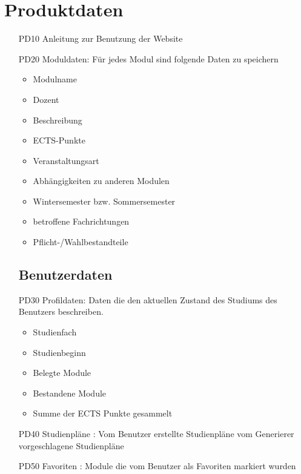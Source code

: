 \section{Produktdaten}
	\begin{itemize}[nosep]
	\subsection{Systemdaten}
	\item[PD10]Anleitung zur Benutzung der 		Website
	\item[PD20]Moduldaten: Für jedes Modul sind folgende Daten zu speichern	
	\begin{itemize}
	\item Modulname
	\item Dozent
	\item Beschreibung
	\item ECTS-Punkte
	\item Veranstaltungsart
	\item Abhängigkeiten zu anderen Modulen
	\item Wintersemester bzw. Sommersemester
	\item betroffene Fachrichtungen 
	\item Pflicht-/Wahlbestandteile
	\end{itemize}	 
	\subsection{Benutzerdaten}
	\item[PD30]Profildaten: Daten die den aktuellen Zustand des Studiums des Benutzers beschreiben.
		\begin{itemize}
		\item Studienfach
		\item Studienbeginn
		\item Belegte Module
		\item Bestandene Module 
		\item Summe der ECTS Punkte gesammelt
		\end{itemize}
\item[PD40]Studienpläne : 
	Vom Benutzer erstellte Studienpläne 
	vom Generierer vorgeschlagene Studienpläne 
\item[PD50] Favoriten : Module die vom Benutzer als Favoriten markiert wurden
\end{itemize}